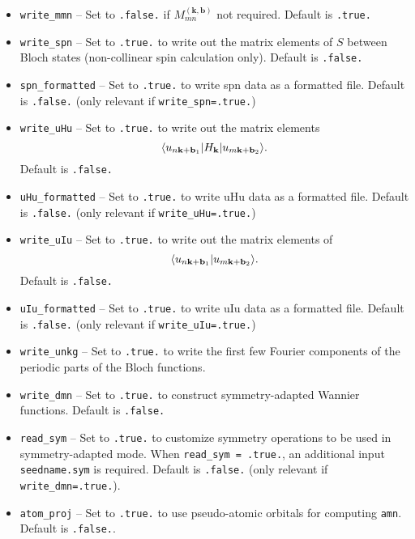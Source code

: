 \begin{itemize}
\item   \verb#write_mmn# -- Set to \verb#.false.# if
   $M_{mn}^{(\mathbf{k,b})}$ not required. Default is \verb#.true.#

\item   \verb#write_spn# -- Set to \verb#.true.# to write out the matrix
   elements of $S$ between Bloch states (non-collinear spin calculation
   only). Default is \verb#.false.#

\item   \verb#spn_formatted# -- Set to \verb#.true.# to write spn data as a formatted file. Default is \verb#.false.# (only relevant if
   \verb#write_spn=.true.#)


\item   \verb#write_uHu# -- Set to \verb#.true.# to write out the matrix
   elements $$\langle u_{n{\bf k}+{\bf b}_1}\vert
H_{\bf k}\vert u_{m{\bf k}+{\bf b}_2}\rangle.
$$
Default is \verb#.false.#

\item   \verb#uHu_formatted# -- Set to \verb#.true.# to write uHu data as a formatted file. Default is \verb#.false.# (only relevant if
   \verb#write_uHu=.true.#)


\item   \verb#write_uIu# -- Set to \verb#.true.# to write out the matrix
   elements of $$\langle  u_{n{\bf k}+{\bf b}_1}\vert
u_{m{\bf k}+{\bf b}_2}\rangle.
$$ Default is \verb#.false.# 

\item   \verb#uIu_formatted# -- Set to \verb#.true.# to write uIu data as a formatted file. Default is \verb#.false.# (only relevant if
   \verb#write_uIu=.true.#)



\item   \verb#write_unkg# -- Set to \verb#.true.# to write the first few
   Fourier components of the periodic parts of the Bloch functions.

\item   \verb#write_dmn# -- Set to \verb#.true.# to construct symmetry-adapted Wannier functions.  
Default is \verb#.false.#

\item   \verb#read_sym# -- Set to \verb#.true.# to customize symmetry operations to be used in symmetry-adapted mode. 
When  \verb#read_sym = .true.#, an additional input {\tt seedname.sym} is required. 
Default is \verb#.false.#
(only relevant if \verb#write_dmn=.true.#). 


\item \verb#atom_proj# -- Set to \verb#.true.# to use pseudo-atomic orbitals for computing \verb#amn#. Default is \verb#.false.#.


\end{itemize}
